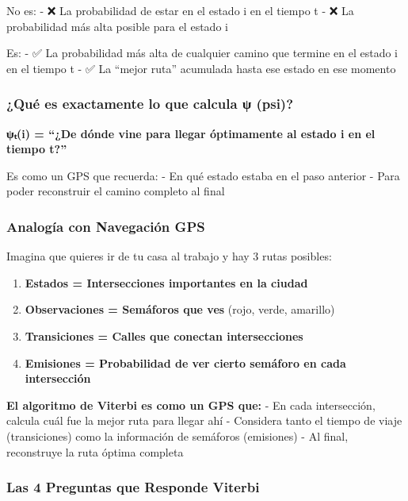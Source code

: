 \documentclass[
]{article}
\providecommand{\tightlist}{%
  \setlength{\itemsep}{0pt}\setlength{\parskip}{0pt}}
\begin{document}
No es: - ❌ La probabilidad de estar en el estado i en el tiempo t - ❌
La probabilidad más alta posible para el estado i

Es: - ✅ La probabilidad más alta de cualquier camino que termine en el
estado i en el tiempo t - ✅ La ``mejor ruta'' acumulada hasta ese
estado en ese momento

\subsubsection{¿Qué es exactamente lo que calcula ψ
(psi)?}\label{quuxe9-es-exactamente-lo-que-calcula-ux3c8-psi}

\textbf{ψₜ(i) = ``¿De dónde vine para llegar óptimamente al estado i en
el tiempo t?''}

Es como un GPS que recuerda: - En qué estado estaba en el paso anterior
- Para poder reconstruir el camino completo al final

\subsubsection{Analogía con Navegación
GPS}\label{analoguxeda-con-navegaciuxf3n-gps}

Imagina que quieres ir de tu casa al trabajo y hay 3 rutas posibles:

\begin{enumerate}
\def\labelenumi{\arabic{enumi}.}
\tightlist
\item
  \textbf{Estados = Intersecciones importantes en la ciudad}
\item
  \textbf{Observaciones = Semáforos que ves} (rojo, verde, amarillo)
\item
  \textbf{Transiciones = Calles que conectan intersecciones}
\item
  \textbf{Emisiones = Probabilidad de ver cierto semáforo en cada
  intersección}
\end{enumerate}

\textbf{El algoritmo de Viterbi es como un GPS que:} - En cada
intersección, calcula cuál fue la mejor ruta para llegar ahí - Considera
tanto el tiempo de viaje (transiciones) como la información de semáforos
(emisiones) - Al final, reconstruye la ruta óptima completa

\subsubsection{Las 4 Preguntas que Responde
Viterbi}\label{las-4-preguntas-que-responde-viterbi}
\end{document}
